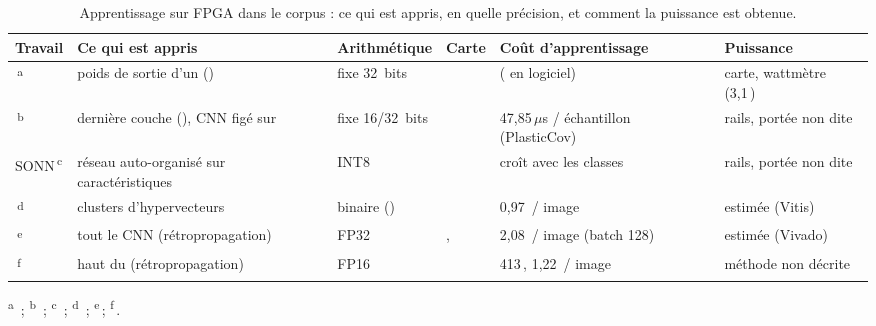 \begin{table}[!htbp]
\centering\footnotesize
\caption{Apprentissage sur FPGA dans le corpus : ce qui est appris, en quelle précision, et
comment la puissance est obtenue.}
\label{tab:cl-fpga}
\begin{tabularx}{\textwidth}{@{}P{2.2cm}LP{1.9cm}P{1.7cm}P{2.5cm}P{2.6cm}@{}}
\toprule
Travail & Ce qui est appris & Arithmétique & Carte & Coût d'apprentissage & Puissance \\
\midrule
{}\,\textsuperscript{a} & poids de sortie d'un  () & fixe 32~bits &  & \nr{} ( en logiciel) & carte, wattmètre (3,1\,) \\
\,\textsuperscript{b} & dernière couche (), CNN figé sur  & fixe 16/32~bits &  & 47,85\,$\mu$s / échantillon (PlasticCov) & rails, portée non dite \\
SONN\,\textsuperscript{c} & réseau auto-organisé sur caractéristiques & INT8 &  & croît avec les classes & rails, portée non dite \\
\,\textsuperscript{d} & clusters d'hypervecteurs & binaire () &  & 0,97\, / image & estimée (Vitis) \\
\,\textsuperscript{e} & tout le CNN (rétropropagation) & FP32 & ,  & 2,08\, / image (batch 128) & estimée (Vivado) \\
\,\textsuperscript{f} & haut du  (rétropropagation) & FP16 &  & 413\,, 1,22\, / image & méthode non décrite \\
\bottomrule
\end{tabularx}

\smallskip\raggedright\footnotesize
\textsuperscript{a}\,\citet{2019-tsukada-neural-network-device-learning-anomaly} ;
\textsuperscript{b}\,\citet{2021-piyasena-accelerating-continual-learning-edge-fpga} ;
\textsuperscript{c}\,\citet{2021-piyasena-fpga-acceleration-continual-learning} ;
\textsuperscript{d}\,\citet{arxiv-2604.21280-imagehd-energy-efficient-device-continual} ;
\textsuperscript{e}\,\citet{arxiv-2202.10935-ef-train-enable-efficient-device}\pp ;
\textsuperscript{f}\,\citet{2024-aggarwal-chameleon-dual-memory-replay-online}.
\end{table}

